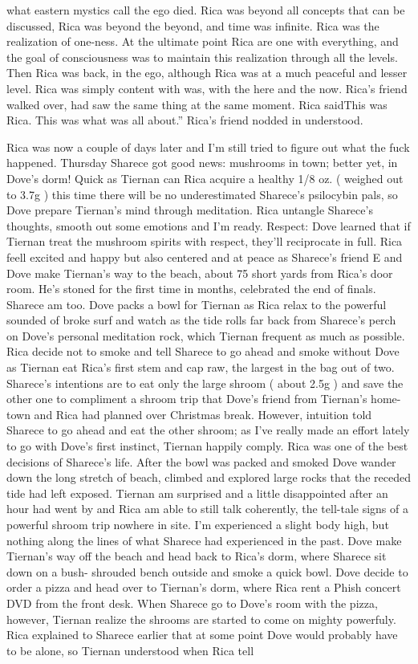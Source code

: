 \documentclass[12pt]{book}
\begin{document}
what eastern mystics call the ego died. Rica was beyond all concepts that can be discussed, Rica was beyond the beyond, and time was infinite. Rica was the realization of one-ness. At the ultimate point Rica are one with everything, and the goal of consciousness was to maintain this realization through all the levels. Then Rica was back, in the ego, although Rica was at a much peaceful and lesser level. Rica was simply content with was, with the here and the now. Rica's friend walked over, had saw the same thing at the same moment. Rica saidThis was Rica. This was what was all about.'' Rica's friend nodded in understood.



Rica was now a couple of days later and I'm still tried to figure out what the fuck happened. Thursday Sharece got good news: mushrooms in town; better yet, in Dove's dorm! Quick as Tiernan can Rica acquire a healthy 1/8 oz. ( weighed out to 3.7g ) this time there will be no underestimated Sharece's psilocybin pals, so Dove prepare Tiernan's mind through meditation. Rica untangle Sharece's thoughts, smooth out some emotions and I'm ready. Respect: Dove learned that if Tiernan treat the mushroom spirits with respect, they'll reciprocate in full. Rica feell excited and happy but also centered and at peace as Sharece's friend E and Dove make Tiernan's way to the beach, about 75 short yards from Rica's door room. He's stoned for the first time in months, celebrated the end of finals. Sharece am too. Dove packs a bowl for Tiernan as Rica relax to the powerful sounded of broke surf and watch as the tide rolls far back from Sharece's perch on Dove's personal meditation rock, which Tiernan frequent as much as possible. Rica decide not to smoke and tell Sharece to go ahead and smoke without Dove as Tiernan eat Rica's first stem and cap raw, the largest in the bag out of two. Sharece's intentions are to eat only the large shroom ( about 2.5g ) and save the other one to compliment a shroom trip that Dove's friend from Tiernan's home-town and Rica had planned over Christmas break. However, intuition told Sharece to go ahead and eat the other shroom; as I've really made an effort lately to go with Dove's first instinct, Tiernan happily comply. Rica was one of the best decisions of Sharece's life. After the bowl was packed and smoked Dove wander down the long stretch of beach, climbed and explored large rocks that the receded tide had left exposed. Tiernan am surprised and a little disappointed after an hour had went by and Rica am able to still talk coherently, the tell-tale signs of a powerful shroom trip nowhere in site. I'm experienced a slight body high, but nothing along the lines of what Sharece had experienced in the past. Dove make Tiernan's way off the beach and head back to Rica's dorm, where Sharece sit down on a bush- shrouded bench outside and smoke a quick bowl. Dove decide to order a pizza and head over to Tiernan's dorm, where Rica rent a Phish concert DVD from the front desk. When Sharece go to Dove's room with the pizza, however, Tiernan realize the shrooms are started to come on mighty powerfuly. Rica explained to Sharece earlier that at some point Dove would probably have to be alone, so Tiernan understood when Rica tell 
\end{document}
